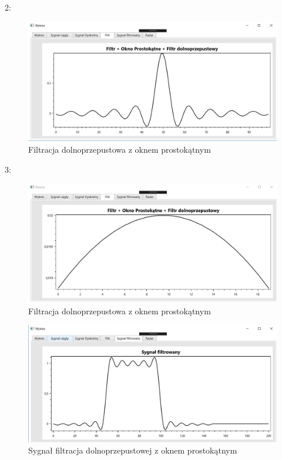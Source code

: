 \documentclass[12pt]{article}
\begin{document}
2:
\begin{figure}[h!]
 \centering
 \includegraphics[width=12.3cm]{filtrMk.PNG}
 \vspace{-0.3cm}
 \caption{Filtracja dolnoprzepustowa z oknem prostokątnym}
 \label{Wykres dla wyników eksperymentu drugiego}
\end{figure}
\newpage

3:
\begin{figure}[h!]
 \centering
 \includegraphics[width=12.3cm]{dK.PNG}
 \vspace{-0.3cm}
 \caption{Filtracja dolnoprzepustowa z oknem prostokątnym}
 \label{pdg}
\end{figure}
\newpage

\begin{figure}[h!]
 \centering
 \includegraphics[width=12.3cm]{filtrMkS.PNG}
 \vspace{-0.3cm}
 \caption{Sygnał filtracja dolnoprzepustowej z oknem prostokątnym}
 \label{filtrMks}
\end{figure}
\end{document}
